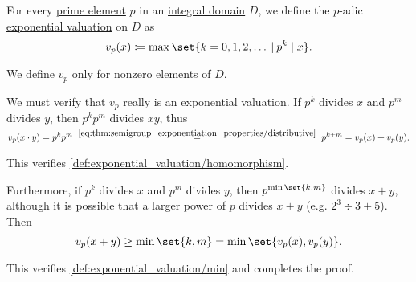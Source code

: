 \begin{definition}\label{def:padic_valuation}
  For every \hyperref[def:domain_divisibility/prime]{prime element} \( p \) in an \hyperref[def:integral_domain]{integral domain} \( D \), we define the \( p \)-adic \hyperref[def:exponential_valuation]{exponential valuation} on \( D \) as
  \begin{equation}\label{eq:def:padic_valuation}
    v_p(x) \coloneqq \max\set{ k = 0, 1, 2, \ldots \given p^k \mid x }.
  \end{equation}
\end{definition}
\begin{comments}
  \item We define \( v_p \) only for nonzero elements of \( D \).
\end{comments}
\begin{defproof}
  We must verify that \( v_p \) really is an exponential valuation. If \( p^k \) divides \( x \) and \( p^m \) divides \( y \), then \( p^k p^m \) divides \( xy \), thus
  \begin{equation*}
    v_p(x \cdot y)
    =
    p^k p^m
    \reloset {\eqref{eq:thm:semigroup_exponentiation_properties/distributive}} =
    p^{k + m}
    =
    v_p(x) + v_p(y).
  \end{equation*}

  This verifies \cref{def:exponential_valuation/homomorphism}.

  Furthermore, if \( p^k \) divides \( x \) and \( p^m \) divides \( y \), then \( p^{\min\set{ k, m }} \) divides \( x + y \), although it is possible that a larger power of \( p \) divides \( x + y \) (e.g. \( 2^3 \div 3 + 5 \)). Then
  \begin{equation*}
    v_p(x + y)
    \geq
    \min\set{ k, m }
    =
    \min\set{ v_p(x), v_p(y) }.
  \end{equation*}

  This verifies \cref{def:exponential_valuation/min} and completes the proof.
\end{defproof}

